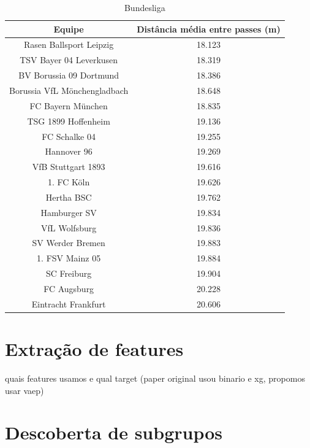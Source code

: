 \documentclass{article}
\begin{document}
\begin{table}[H]
	\centering
	\begin{tabular}{|c|c|}
		\hline
		\textbf{Equipe}              & \textbf{Distância média entre
			passes
			(m)}
		\\
		\hline
		Rasen Ballsport Leipzig      & 18.123
		\\ \hline
		TSV Bayer 04 Leverkusen      & 18.319
		\\ \hline
		BV Borussia 09 Dortmund      & 18.386
		\\ \hline
		Borussia VfL Mönchengladbach & 18.648
		\\ \hline
		FC Bayern München            & 18.835
		\\ \hline
		TSG 1899 Hoffenheim          & 19.136
		\\ \hline
		FC Schalke 04                & 19.255
		\\ \hline
		Hannover 96                  & 19.269
		\\ \hline
		VfB Stuttgart 1893           & 19.616
		\\ \hline
		1. FC Köln                   & 19.626
		\\ \hline
		Hertha BSC                   & 19.762
		\\ \hline
		Hamburger SV                 & 19.834
		\\ \hline
		VfL Wolfsburg                & 19.836
		\\ \hline
		SV Werder Bremen             & 19.883
		\\ \hline
		1. FSV Mainz 05              & 19.884
		\\ \hline
		SC Freiburg                  & 19.904
		\\ \hline
		FC Augsburg                  & 20.228
		\\ \hline
		Eintracht Frankfurt          & 20.606
		\\ \hline
	\end{tabular}
	\caption{Bundesliga}
	\label{tab:average_distance_germany}
\end{table}

\section{Extração de features}

quais features usamos e qual target (paper original usou binario e xg, propomos
usar vaep)

\section{Descoberta de subgrupos}
\end{document}
